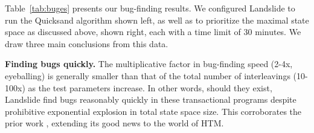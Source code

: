 \documentclass[10pt]{sigplanconf}
\begin{document}
Table~\ref{tab:buges}
presents our bug-finding results.
We configured Landslide to run the Quicksand algorithm \cite{quicksand}
shown left,
as well as to prioritize the maximal state space as discussed above,
shown right,
each with a time limit of 30 minutes.
We draw three main conclusions from this data.

		{\bf Finding bugs quickly.}
		The multiplicative factor in bug-finding speed (2-4x, eyeballing) is generally smaller
		than that of the total number of interleavings (10-100x)
		as the test parameters increase.
		In other words,
		should they exist,
		Landslide find bugs reasonably quickly in these transactional programs
		despite prohibitive exponential explosion in total state space size.
		This corroborates the prior work \cite{quicksand},
		extending its good news to the world of HTM.
\end{document}
